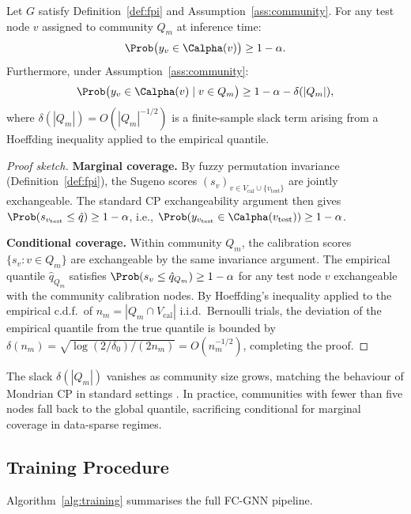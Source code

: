 \begin{theorem}
\label{thm:coverage}
Let $G$ satisfy Definition~\ref{def:fpi} and Assumption~\ref{ass:community}.
For any test node $v$ assigned to community $Q_m$ at inference time:
\[
  \Prob\bigl(y_v \in \Calpha(v)\bigr) \ge 1 - \alpha.
\]
Furthermore, under Assumption~\ref{ass:community}:
\[
  \Prob\bigl(y_v \in \Calpha(v) \mid v \in Q_m\bigr)
  \ge 1 - \alpha - \delta(|Q_m|),
\]
where $\delta(|Q_m|) = O(|Q_m|^{-1/2})$ is a finite-sample slack term
arising from a Hoeffding inequality applied to the empirical quantile.
\end{theorem}

\begin{proof}[Proof sketch]
\textbf{Marginal coverage.}
By fuzzy permutation invariance (Definition~\ref{def:fpi}), the Sugeno
scores $(s_v)_{v \in V_\text{cal} \cup \{v_\text{test}\}}$ are jointly
exchangeable.
The standard CP exchangeability argument \citep{angelopoulos21} then gives
$\Prob(s_{v_\text{test}} \le \hat{q}) \ge 1-\alpha$, i.e.,
$\Prob(y_{v_\text{test}} \in \Calpha(v_\text{test})) \ge 1-\alpha$.

\textbf{Conditional coverage.}
Within community $Q_m$, the calibration scores $\{s_v : v \in Q_m\}$
are exchangeable by the same invariance argument.
The empirical quantile $\hat{q}_{Q_m}$ satisfies
$\Prob(s_v \le \hat{q}_{Q_m}) \ge 1-\alpha$ for any
test node $v$ exchangeable with the community calibration nodes.
By Hoeffding's inequality applied to the empirical c.d.f.\ of
$n_m = |Q_m \cap V_\text{cal}|$ i.i.d.\ Bernoulli trials,
the deviation of the empirical quantile from the true quantile is bounded by
$\delta(n_m) = \sqrt{\log(2/\delta_0) / (2n_m)} = O(n_m^{-1/2})$,
completing the proof.
\end{proof}

\begin{remark}
The slack $\delta(|Q_m|)$ vanishes as community size grows, matching the
behaviour of Mondrian CP in standard settings \citep{rrgnn}.
In practice, communities with fewer than five nodes fall back to the
global quantile, sacrificing conditional for marginal coverage in
data-sparse regimes.
\end{remark}

\subsection{Training Procedure}

Algorithm~\ref{alg:training} summarises the full FC-GNN pipeline.

